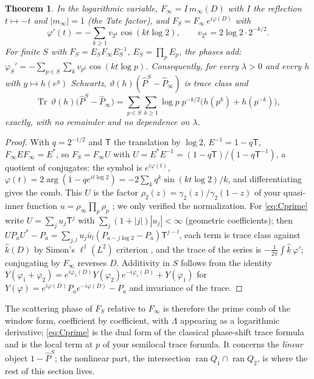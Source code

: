 \documentclass[11pt]{amsart}
\newtheorem{theorem}{Theorem}[section]
\theoremstyle{definition}
\theoremstyle{remark}
\newcommand{\Tr}{\operatorname{Tr}}
\newcommand{\ran}{\operatorname{ran}}
\newcommand{\Pih}{\widehat P}
\begin{document}
\begin{theorem}\label{thm:phase}
In the logarithmic variable, $F_\infty=I\,m_\infty(D)$ with $I$ the reflection $t\mapsto-t$ and $|m_\infty|=1$ (the Tate
factor), and $F_S=F_\infty\,e^{i\varphi(D)}$ with
\[
\varphi'(t)=-\sum_{k\ge1}v_{2^k}\cos(kt\log2),\qquad v_{2^k}=2\log2\cdot2^{-k/2}.
\]
For finite $S$ with $F_S=E_SF_\infty E_S^{-1}$, $E_S=\prod_pE_p$, the phases add: $\varphi_S'=-\sum_{p\in S}\sum_kv_{p^k}\cos(kt\log p)$.
Consequently, for every $\lambda>0$ and every $h$ with $y\mapsto h(e^y)$ Schwartz, $\vartheta(h)(\Pih^S-\Pih_\infty)$ is trace class and
\begin{equation}\label{eq:Cprime}
\Tr\,\vartheta(h)\big(\Pih^S-\Pih_\infty\big)=\sum_{p\in S}\sum_{k\ge1}\log p\;p^{-k/2}\big(h(p^k)+h(p^{-k})\big),
\end{equation}
exactly, with no remainder and no dependence on $\lambda$.
\end{theorem}
\begin{proof}
With $q=2^{-1/2}$ and $\mathsf T$ the translation by $\log2$, $E^{-1}=1-q\mathsf T$, $F_\infty EF_\infty=E^*$, so
$F_S=F_\infty U$ with $U=E^*E^{-1}=(1-q\mathsf T)/(1-q\mathsf T^{-1})$, a quotient of conjugates: the symbol is
$e^{i\varphi(t)}$, $\varphi(t)=2\arg(1-qe^{it\log2})=-2\sum_kq^k\sin(kt\log2)/k$, and differentiating gives the comb. This $U$ is
the factor $\rho_2(z)=\gamma_2(z)/\gamma_2(1-z)$ of your quasi-inner function $u=\rho_\infty\prod_p\rho_p$
\cite[Lemma~3.1]{CCquasi}; we only verified the normalization. For \eqref{eq:Cprime} write $U=\sum_ju_j\mathsf T^{j}$ with
$\sum_j(1+|j|)|u_j|<\infty$ (geometric coefficients); then $UP_aU^*-P_a=\sum_{j,l}u_j\bar u_l(P_{a-j\log2}-P_a)\mathsf T^{j-l}$,
each term is trace class against $\widehat k(D)$ by Simon's $\ell^1(L^2)$ criterion \cite[Thm.~4.5]{Simon}, and the trace of the
series is $-\frac1{2\pi}\int\widehat k\,\varphi'$; conjugating by $F_\infty$ reverses $D$. Additivity in $S$ follows from the
identity $Y(\varphi_1+\varphi_2)=e^{i\varphi_1(D)}Y(\varphi_2)e^{-i\varphi_1(D)}+Y(\varphi_1)$ for
$Y(\varphi)=e^{i\varphi(D)}P_ae^{-i\varphi(D)}-P_a$ and invariance of the trace.
\end{proof}

The scattering phase of $F_S$ relative to $F_\infty$ is therefore the prime comb of the window form, coefficient by
coefficient, with $\Lambda$ appearing as a logarithmic derivative; \eqref{eq:Cprime} is the dual form of the classical
phase-shift trace formula and is the local term at $p$ of your semilocal trace formula. It concerns the \emph{linear}
object $1-\Pih^S$; the nonlinear part, the intersection $\ran Q_1\cap\ran Q_2$, is where the rest of this section lives.
\end{document}
